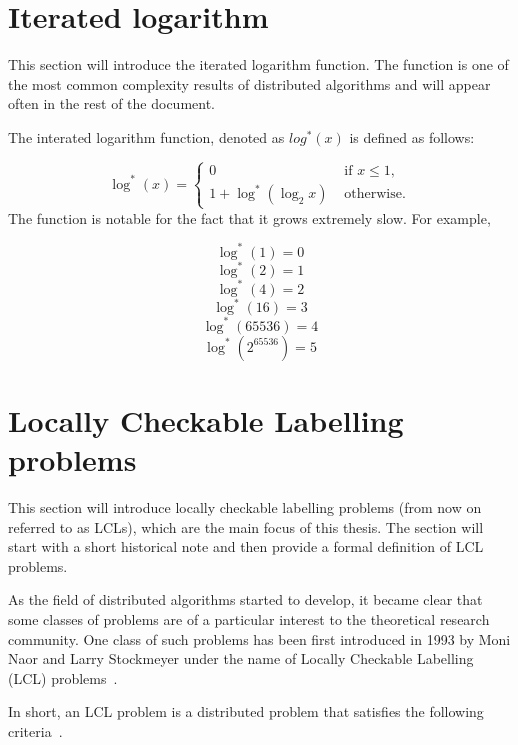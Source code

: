 \section{Iterated logarithm}

This section will introduce the iterated logarithm function. The function is
one of the most common complexity results of distributed algorithms and will
appear often in the rest of the document.

The interated logarithm function, denoted as $log^*(x)$ is defined as follows:

\[
    \log^*(x) = \begin{cases}
        0 & \text{ if $x \le 1$}, \\
        1 + \log^*(\log_2 x) & \text{ otherwise}.
    \end{cases}
\]
The function is notable for the fact that it grows extremely slow. For example,

$$\log^*(1) = 0$$
$$\log^*(2) = 1$$
$$\log^*(4) = 2$$
$$\log^*(16) = 3$$
$$\log^*(65536) = 4$$
$$\log^*(2^{65536}) = 5$$

\section{Locally Checkable Labelling problems}

This section will introduce locally checkable labelling problems (from now on referred to as
LCLs), which are the main focus of this thesis. The section will start with
a short historical note and then provide a formal definition of
LCL problems.

As the field of distributed algorithms started to develop, it became clear
that some classes of problems
are of a particular interest to the theoretical research community.
One class of such problems has been first introduced in 1993 by
Moni Naor and Larry Stockmeyer under the name of Locally Checkable 
Labelling (LCL) problems~\cite{Naor1993}.

In short, an LCL problem is a distributed problem that satisfies the 
following criteria~\cite{Naor1993, Suomela2020}.

